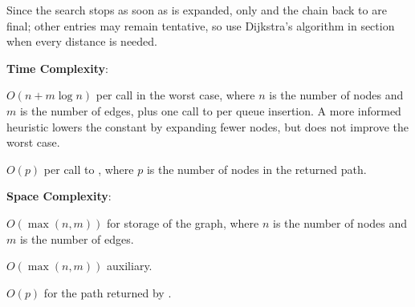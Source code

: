 Since the search stops as soon as  is expanded, only  and the  chain back to  are final; other entries may remain tentative, so use Dijkstra's algorithm in section  when every distance is needed.

\textbf{Time Complexity}:
\begin{compactitem}
  \item $O(n + m \log n)$ per call in the worst case, where $n$ is the number of nodes and $m$ is the number of edges, plus one call to  per queue insertion. A more informed heuristic lowers the constant by expanding fewer nodes, but does not improve the worst case.
  \item $O(p)$ per call to , where $p$ is the number of nodes in the returned path.
\end{compactitem}

\textbf{Space Complexity}:
\begin{compactitem}
  \item $O(\max\left(n, m\right))$ for storage of the graph, where $n$ is the number of nodes and $m$ is the number of edges.
  \item $O(\max\left(n, m\right))$ auxiliary.
  \item $O(p)$ for the path returned by .
\end{compactitem}

